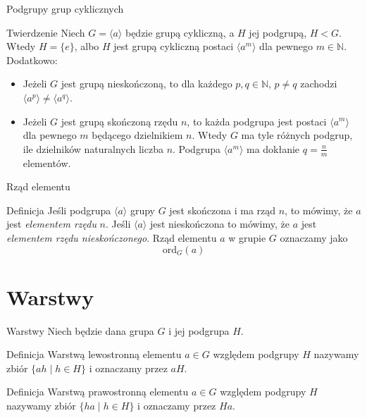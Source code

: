 \documentclass{beamer}
\newcommand{\ord}{\textrm{ord}}
\begin{document}
\begin{frame}{Podgrupy grup cyklicznych}
    \begin{block}{Twierdzenie}
        Niech $G =\langle a \rangle$ będzie grupą cykliczną, a $H$ jej podgrupą,
        $H < G$. Wtedy $H = \{e\}$, albo $H$ jest grupą cykliczną postaci $\langle a^m \rangle$ dla pewnego $m \in \mathbb{N}$.
        Dodatkowo:
        \begin{itemize}
            \item Jeżeli $G$ jest grupą nieskończoną, to dla każdego $p,q\in \mathbb{N}$, $p \neq q$ zachodzi $\langle a^p \rangle \neq \langle a^q \rangle$.
            \item Jeżeli $G$ jest grupą skończoną rzędu $n$, to każda podgrupa jest postaci $\langle a^m \rangle$ dla pewnego $m$ będącego dzielnikiem $n$. Wtedy $G$ ma tyle różnych podgrup, ile dzielników naturalnych liczba $n$. Podgrupa $\langle a^m \rangle$ ma dokłanie $q = \frac{n}{m}$ elementów.
        \end{itemize}
    \end{block}
\end{frame}

\begin{frame}{Rząd elementu}
    \begin{block}{Definicja}
        Jeśli podgrupa $\langle a \rangle$ grupy $G$ jest skończona i ma rząd $n$, 
        to mówimy, że $a$ jest \textit{elementem rzędu} $n$. Jeśli $\langle a \rangle$
        jest nieskończona to mówimy, że $a$ jest \textit{elementem rzędu nieskończonego}.
        Rząd elementu $a$ w grupie $G$ oznaczamy jako 
        $$ \ord_G(a)$$
    \end{block}    
\end{frame}

\section{Warstwy}

\begin{frame}{Warstwy}
    Niech będzie dana grupa $G$ i jej podgrupa $H$.
    \begin{block}{Definicja}
        \alert{Warstwą lewostronną} elementu $a \in G$ względem podgrupy $H$
        nazywamy zbiór $\{a h \mid h \in H\}$ i oznaczamy przez $aH$.
    \end{block}    
    \begin{block}{Definicja}
        \alert{Warstwą prawostronną} elementu $a \in G$ względem podgrupy $H$
        nazywamy zbiór $\{h  a \mid h \in H\}$ i oznaczamy przez $Ha$.
    \end{block}
\end{frame}
\end{document}

